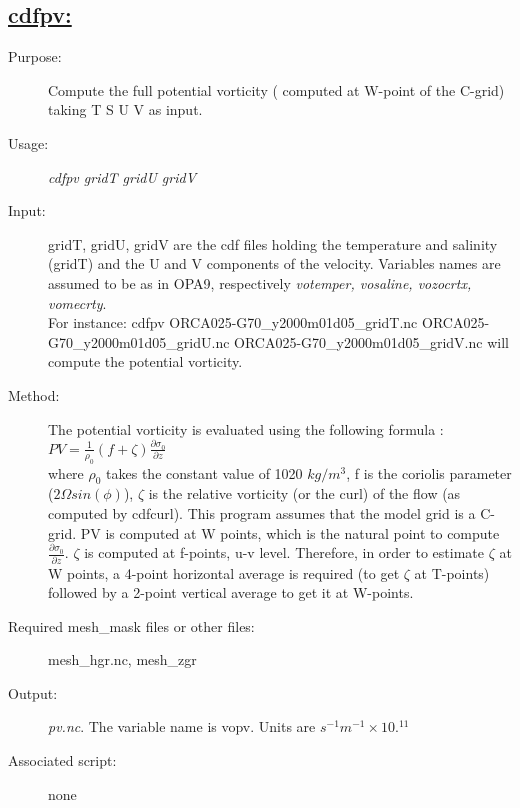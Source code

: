 \documentclass[a4paper,11pt]{article}
\begin{document}
\newpage
\subsection*{\underline{cdfpv:}}
\begin{description}
\item[Purpose:] Compute the full potential vorticity ( computed at W-point of the C-grid) taking T S U V as input.
\item[Usage:] {\em cdfpv gridT gridU gridV }\\
\item[Input:] gridT, gridU, gridV are the cdf files holding the temperature and salinity (gridT) and the  U and V components of the velocity. Variables names are assumed to
be as in OPA9, respectively {\em votemper, vosaline, vozocrtx, vomecrty}.\\
For instance: cdfpv ORCA025-G70\_y2000m01d05\_gridT.nc ORCA025-G70\_y2000m01d05\_gridU.nc ORCA025-G70\_y2000m01d05\_gridV.nc
will compute  the potential vorticity. \\
\item[Method:] The potential vorticity is evaluated using the following formula :\\

$   PV = \frac{1}{\rho_0}(f+\zeta)\frac{\partial\sigma_0}{\partial z} $ \\

where $\rho_0 $ takes the constant value of 1020 $kg/m^3$, f is the coriolis parameter ($2\Omega sin(\phi)$), $\zeta$ is the relative vorticity
(or the curl) of the flow (as computed by cdfcurl). This program assumes that the model grid is a C-grid. PV is computed at W points, which is
the natural point to compute $\frac{\partial\sigma_0}{\partial z} $. $\zeta$ is computed at f-points, u-v level. Therefore, in order to estimate
$\zeta$ at W points, a 4-point horizontal average is required (to get $\zeta$ at T-points) followed by a 2-point vertical average to get it 
at W-points.

\item[Required mesh\_mask files or other files:] mesh\_hgr.nc, mesh\_zgr
\item[Output:] {\em pv.nc}. The variable name is vopv. Units are $s^{-1}m^{-1}\times10.^{11}$
\item[Associated script:] none
\end{description}

\newpage
\end{document}
